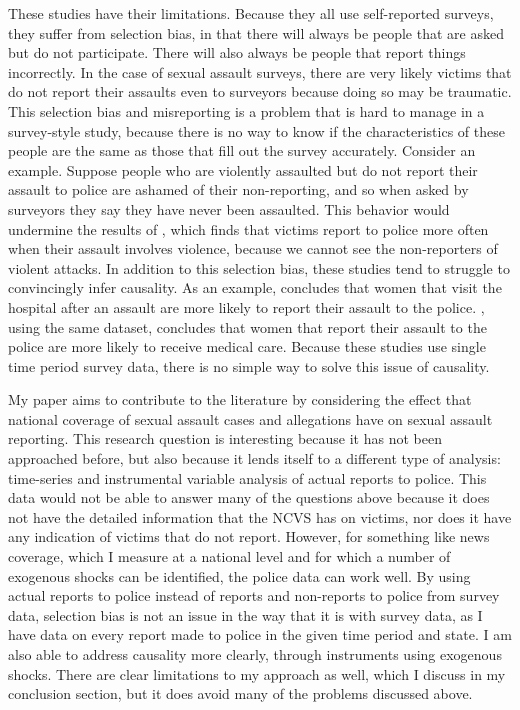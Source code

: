 \documentclass[AER,draftmode]{AEA}
\begin{document}
These studies have their limitations. Because they all use self-reported surveys, they suffer from selection bias, in that there will always be people that are asked but do not participate. There will also always be people that report things incorrectly. In the case of sexual assault surveys, there are very likely victims that do not report their assaults even to surveyors because doing so may be traumatic. This selection bias and misreporting is a problem that is  hard to manage in a survey-style study, because there is no way to know if the characteristics of these people are the same as those that fill out the survey accurately. Consider an example. Suppose people who are violently assaulted but do not report their assault to police are ashamed of their non-reporting, and so when asked by surveyors they say they have never been assaulted. This behavior would undermine the results of , which finds that victims report to police more often when their assault involves violence, because we cannot see the non-reporters of violent attacks. In addition to this selection bias, these studies tend to struggle to convincingly infer causality. As an example,  concludes that women that visit the hospital after an assault are more likely to report their assault to the police. , using the same dataset, concludes that women that report their assault to the police are more likely to receive medical care. Because these studies use single time period survey data, there is no simple way to solve this issue of causality.

My paper aims to contribute to the literature by considering the effect that national coverage of sexual assault cases and allegations have on sexual assault reporting. This research question is interesting because it has not been approached before, but also because it lends itself to a different type of analysis: time-series and instrumental variable analysis of actual reports to police. This data would not be able to answer many of the questions above because it does not have the detailed information that the NCVS has on victims, nor does it have any indication of victims that do not report. However, for something like news coverage, which I measure at a national level and for which a number of exogenous shocks can be identified, the police data can work well. By using actual reports to police instead of reports and non-reports to police from survey data, selection bias is not an issue in the way that it is with survey data, as I have data on every report made to police in the given time period and state. I am also able to address causality more clearly, through instruments using exogenous shocks. There are clear limitations to my approach as well, which I discuss in my conclusion section, but it does avoid many of the problems discussed above.
\end{document}
